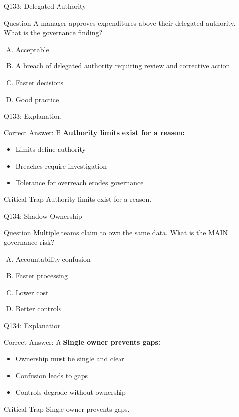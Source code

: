\documentclass{beamer}
\begin{document}
	\begin{frame}{Q133: Delegated Authority}
		\begin{block}{Question}
			A manager approves expenditures above their delegated authority. What is the governance finding?
		\end{block}
		\begin{enumerate}[(A)]
			\item Acceptable
			\item A breach of delegated authority requiring review and corrective action
			\item Faster decisions
			\item Good practice
		\end{enumerate}
	\end{frame}
	
	\begin{frame}{Q133: Explanation}
		\begin{block}{Correct Answer: B}
			\textbf{Authority limits exist for a reason:}
			\begin{itemize}
				\item Limits define authority
				\item Breaches require investigation
				\item Tolerance for overreach erodes governance
			\end{itemize}
		\end{block}
		\begin{alertblock}{Critical Trap}
			Authority limits exist for a reason.
		\end{alertblock}
	\end{frame}
	
	\begin{frame}{Q134: Shadow Ownership}
		\begin{block}{Question}
			Multiple teams claim to own the same data. What is the MAIN governance risk?
		\end{block}
		\begin{enumerate}[(A)]
			\item Accountability confusion
			\item Faster processing
			\item Lower cost
			\item Better controls
		\end{enumerate}
	\end{frame}
	
	\begin{frame}{Q134: Explanation}
		\begin{block}{Correct Answer: A}
			\textbf{Single owner prevents gaps:}
			\begin{itemize}
				\item Ownership must be single and clear
				\item Confusion leads to gaps
				\item Controls degrade without ownership
			\end{itemize}
		\end{block}
		\begin{alertblock}{Critical Trap}
			Single owner prevents gaps.
		\end{alertblock}
	\end{frame}
	
\end{document}
